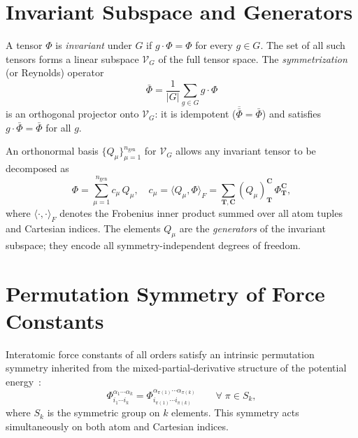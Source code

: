 \documentclass[twocolumn,amsmath,amssymb,aps,prb,10pt,floatfix]{revtex4-2}
\newcommand{\vT}{\mathbf{T}}
\newcommand{\vC}{\mathbf{C}}
\begin{document}
\section{Invariant Subspace and Generators}
\label{sec:invariant}

A tensor $\Phi$ is \emph{invariant} under $G$ if $g \cdot \Phi = \Phi$ for every $g \in G$.
The set of all such tensors forms a linear subspace $\mathcal{V}_G$ of the full tensor space.
The \emph{symmetrization} (or Reynolds) operator~\cite{Serre1977,Sturmfels2008}
\begin{equation}
\bar{\Phi} = \frac{1}{|G|} \sum_{g \in G} g \cdot \Phi
\label{eq:symmetrization}
\end{equation}
is an orthogonal projector onto $\mathcal{V}_G$: it is idempotent ($\overline{\bar\Phi} = \bar\Phi$) and satisfies $g \cdot \bar\Phi = \bar\Phi$ for all $g$.

An orthonormal basis $\{Q_\mu\}_{\mu=1}^{n_{\mathrm{gen}}}$ for $\mathcal{V}_G$ allows any invariant tensor to be decomposed as
\begin{equation}
\Phi = \sum_{\mu=1}^{n_{\mathrm{gen}}} c_\mu \, Q_\mu,
\quad
c_\mu = \langle Q_\mu, \Phi \rangle_F
= \sum_{\vT,\vC} (Q_\mu)_{\vT}^{\vC} \, \Phi_{\vT}^{\vC},
\label{eq:decomposition}
\end{equation}
where $\langle \cdot, \cdot \rangle_F$ denotes the Frobenius inner product summed over all atom tuples and Cartesian indices.
The elements $Q_\mu$ are the \emph{generators} of the invariant subspace; they encode all symmetry-independent degrees of freedom.


\section{Permutation Symmetry of Force Constants}
\label{sec:permutation}

Interatomic force constants of all orders satisfy an intrinsic permutation symmetry inherited from the mixed-partial-derivative structure of the potential energy~\cite{BornHuang1954,Leibfried1961}:
\begin{equation}
\Phi^{\alpha_1 \cdots \alpha_k}_{i_1 \cdots i_k}
= \Phi^{\alpha_{\pi(1)} \cdots \alpha_{\pi(k)}}_{i_{\pi(1)} \cdots i_{\pi(k)}}
\qquad \forall\; \pi \in S_k,
\label{eq:permutation_sym}
\end{equation}
where $S_k$ is the symmetric group on $k$ elements.
This symmetry acts simultaneously on both atom and Cartesian indices.
\end{document}
